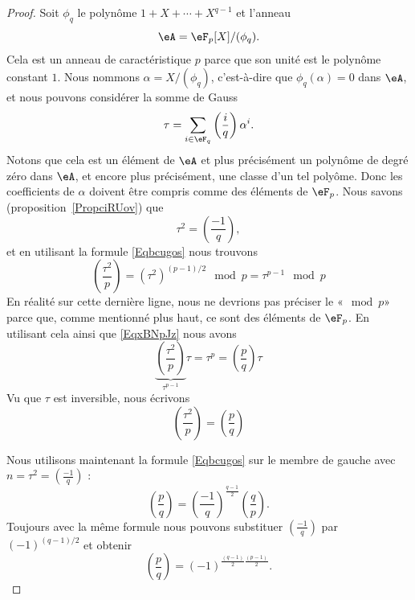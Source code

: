 \begin{proof}
    Soit \( \phi_q\) le polynôme \( 1+X+\cdots+X^{q-1}\) et l'anneau
    \begin{equation}
        \eA=\eF_p[X]/(\phi_q).
    \end{equation}
    Cela est un anneau de caractéristique \( p\) parce que son unité est le polynôme constant \( 1\). Nous nommons \( \alpha=X/(\phi_q)\), c'est-à-dire que \( \phi_q(\alpha)=0\) dans \( \eA\), et nous pouvons considérer la somme de Gauss
    \begin{equation}
        \tau=\sum_{i\in \eF_q}\left(\frac{i}{q}\right)\alpha^i.
    \end{equation}
    Notons que cela est un élément de \( \eA\) et plus précisément un polynôme de degré zéro dans \( \eA\), et encore plus précisément, une classe d'un tel polyôme. Donc les coefficients de \( \alpha\) doivent être compris comme des éléments de \( \eF_p\).
    Nous savons (proposition~\ref{PropciRUov}) que
    \begin{equation}
        \tau^2=\left(\frac{-1}{q}\right),
    \end{equation}
    et en utilisant la formule \eqref{Eqbcugos} nous trouvons
    \begin{equation}
        \left(\frac{\tau^2}{p}\right)=(\tau^2)^{(p-1)/2}\mod p=\tau^{p-1}\mod p
    \end{equation}
    En réalité sur cette dernière ligne, nous ne devrions pas préciser le «\( \mod p\)» parce que, comme mentionné plus haut, ce sont des éléments de \( \eF_p\). En utilisant cela ainsi que \eqref{EqxBNpJz} nous avons
    \begin{equation}
        \underbrace{\left(\frac{\tau^2}{p}\right)}_{\tau^{p-1}}\tau=\tau^p=\left(\frac{p}{q}\right)\tau
    \end{equation}
    Vu que \( \tau\) est inversible, nous écrivons
    \begin{equation}
        \left(\frac{\tau^2}{p}\right)=\left(\frac{p}{q}\right)
    \end{equation}

    Nous utilisons maintenant la formule \eqref{Eqbcugos} sur le membre de gauche avec \( n=\tau^2=\left(\frac{-1}{q}\right)\) :
    \begin{equation}
        \left(\frac{p}{q}\right)=\left(\frac{-1}{q}\right)^{\frac{ q-1 }{2}}\left(\frac{q}{p}\right).
    \end{equation}
    Toujours avec la même formule nous pouvons substituer \( \left(\frac{-1}{q}\right)\) par \( (-1)^{(q-1)/2}\) et obtenir
    \begin{equation}
        \left(\frac{p}{q}\right)=(-1)^{\frac{ (q-1) }{2}\frac{ (p-1) }{2}}.
    \end{equation}

\end{proof}



